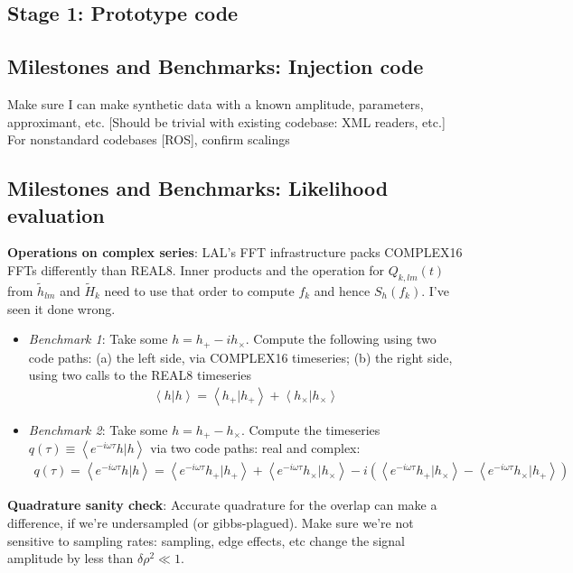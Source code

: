 \documentclass[twocolumn,prd,nofootinbib]{revtex4}
\newcommand\qmstateproduct[2]{\left\langle#1|#2\right\rangle}
\begin{document}
\begin{widetext}
\section{Stage 1: Prototype code}
\subsection{Milestones and Benchmarks: Injection code }
Make sure I can make synthetic data with a known amplitude, parameters, approximant, etc.  [Should be trivial with
  existing codebase: XML readers, etc.] For nonstandard codebases [ROS], confirm scalings

\subsection{Milestones and Benchmarks: Likelihood evaluation}

\noindent \textbf{Operations on complex series}: LAL's FFT infrastructure packs COMPLEX16 FFTs differently than REAL8.
Inner products and the operation for $Q_{k,lm}(t)$ from $\tilde{h}_{lm}$ and $\tilde{H}_k$ need to use that order to
compute $f_k$ and hence $S_h(f_k)$.  I've seen it done wrong.
\begin{itemize}
\item  \emph{Benchmark 1}: Take some $h=h_+-ih_\times$.  Compute the following using two code paths: (a) the left side,
  via COMPLEX16 timeseries; (b) the right side, using two calls to the REAL8 timeseries
\begin{eqnarray}
\qmstateproduct{h}{h}=\qmstateproduct{h_+}{h_+}+\qmstateproduct{h_\times}{h_\times}
\end{eqnarray}
\item \emph{Benchmark 2}: Take some $h=h_+-h_\times$.  Compute the timeseries $q(\tau)\equiv \qmstateproduct{e^{-i\omega
    \tau}h}{h}$ via two code paths: real and complex:
\begin{eqnarray}
q(\tau) = \qmstateproduct{e^{-i\omega \tau} h}{h} = 
\qmstateproduct{e^{-i\omega \tau}h_+}{h_+} + \qmstateproduct{e^{-i\omega \tau}h_\times}{h_\times}
-i(\qmstateproduct{e^{-i\omega \tau}h_+}{h_\times} - \qmstateproduct{e^{-i\omega \tau}h_\times}{h_+})
\end{eqnarray}
\end{itemize}

\noindent \textbf{Quadrature sanity check}: Accurate quadrature for the overlap can make a difference, if we're
undersampled (or gibbs-plagued). Make sure we're not sensitive to sampling rates: sampling, edge effects, etc change the
signal amplitude by less than $\delta \rho^2 \ll 1$.


\end{widetext}
\end{document}
